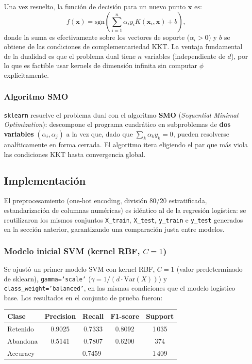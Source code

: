 \documentclass[spanish]{article}
\begin{document}
Una vez resuelto, la función de decisión para un nuevo punto $\mathbf{x}$ es:
\begin{equation}
f(\mathbf{x}) = \mathrm{sgn}\!\left(\sum_{i=1}^{n}\alpha_i y_i K(\mathbf{x}_i,\mathbf{x}) + b\right),
\end{equation}
donde la suma es efectivamente sobre los vectores de soporte ($\alpha_i > 0$) y $b$ se obtiene de las condiciones de complementariedad KKT. La ventaja fundamental de la dualidad es que el problema dual tiene $n$ variables (independiente de $d$), por lo que es factible usar kernels de dimensión infinita sin computar $\phi$ explícitamente.

\subsubsection{Algoritmo SMO}

\texttt{sklearn} resuelve el problema dual con el algoritmo \textbf{SMO} (\textit{Sequential Minimal Optimization}): descompone el programa cuadrático en subproblemas de \textbf{dos variables} $(\alpha_i, \alpha_j)$ a la vez que, dado que $\sum_k\alpha_k y_k = 0$, pueden resolverse analíticamente en forma cerrada. El algoritmo itera eligiendo el par que más viola las condiciones KKT hasta convergencia global.

\subsection{Implementación}

El preprocesamiento (one-hot encoding, división 80/20 estratificada, estandarización de columnas numéricas) es idéntico al de la regresión logística: se reutilizaron los mismos conjuntos \texttt{X\_train}, \texttt{X\_test}, \texttt{y\_train} e \texttt{y\_test} generados en la sección anterior, garantizando una comparación justa entre modelos.

\subsubsection{Modelo inicial SVM (kernel RBF, $C=1$)}

Se ajustó un primer modelo SVM con kernel RBF, $C=1$ (valor predeterminado de sklearn), \texttt{gamma='scale'} ($\gamma = 1/(d\cdot\mathrm{Var}(X))$) y \texttt{class\_weight='balanced'}, en las mismas condiciones que el modelo logístico base. Los resultados en el conjunto de prueba fueron:

\begin{center}
\begin{tabular}{lcccc}
\toprule
\textbf{Clase} & \textbf{Precision} & \textbf{Recall} & \textbf{F1-score} & \textbf{Support} \\
\midrule
Retenido  & 0.9025 & 0.7333 & 0.8092 & 1\,035 \\
Abandona  & 0.5141 & 0.7807 & 0.6200 &   374 \\
\midrule
Accuracy  & \multicolumn{3}{c}{0.7459} & 1\,409 \\
\bottomrule
\end{tabular}
\end{center}
\end{document}
